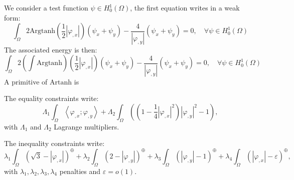 We consider a test function $\psi \in H^1_0(\Omega)$, the first equation writes in a weak form:
\begin{equation}
\label{eq:weak form}
\int_{\Omega} 2\mathrm{Argtanh}(\frac12 |\varphi_{,x}|)(\psi_x + \psi_y) - \frac{4}{|\varphi_{,y}|}(\psi_x + \psi_y) = 0, \quad \forall \psi \in H^1_0(\Omega)
\end{equation}
The associated energy is then: 
\begin{equation}
\label{eq:energy}
\int_{\Omega} 2\left( \int \mathrm{Argtanh} \right)(\frac12 |\varphi_{,x}|)(\psi_x + \psi_y) - \frac{4}{|\varphi_{,y}|}(\psi_x + \psi_y) = 0, \quad \forall \psi \in H^1_0(\Omega)
\end{equation}
A primitive of $\mathrm{Artanh}$ is 

The equality constraints write:
\begin{equation}
\Lambda_1 \int_{\Omega} \left\langle \varphi_{,x} ; \varphi_{,y} \right\rangle + \Lambda_2 \int_{\Omega} \left( (1 - \frac14 |\varphi_{,x}|^2) |\varphi_{,y}|^2 - 1 \right),
\end{equation}
with $\Lambda_1$ and $\Lambda_2$ Lagrange multipliers.

The inequality constraints write:
\begin{equation}
\label{eq:inequality constraints energy}
\lambda_1 \int_{\Omega} \left(\sqrt{3} - |\varphi_{,x}| \right)^\oplus + \lambda_2 \int_{\Omega} \left(2 - |\varphi_{,y}| \right)^\oplus + \lambda_3 \int_{\Omega} \left(|\varphi_{,y}| - 1 \right)^\oplus + \lambda_4 \int_{\Omega} \left(|\varphi_{,x}| - \varepsilon \right)^\oplus,
\end{equation}
with $\lambda_1,\lambda_2,\lambda_3,\lambda_4$ penalties  and $\varepsilon = o(1)$.







